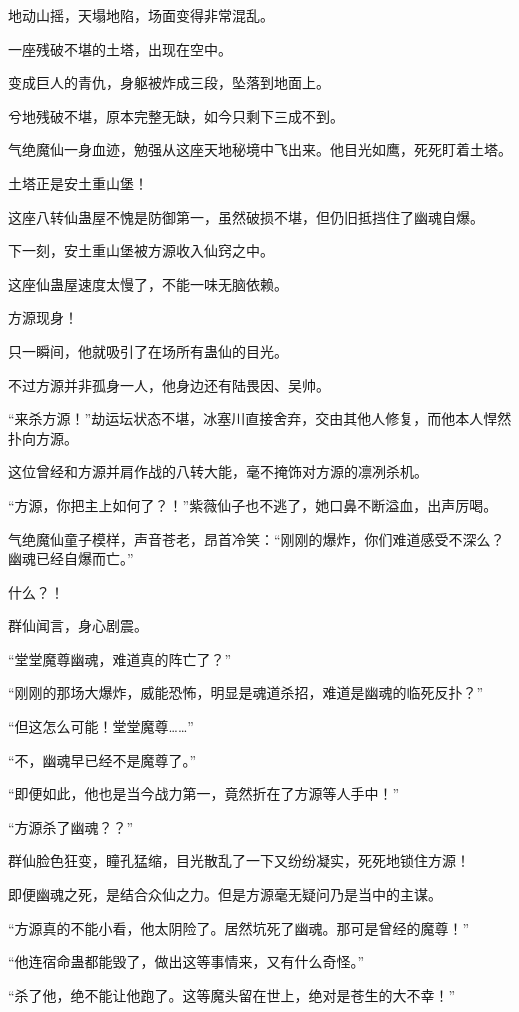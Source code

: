 \begin{this_body}
地动山摇，天塌地陷，场面变得非常混乱。

一座残破不堪的土塔，出现在空中。

变成巨人的青仇，身躯被炸成三段，坠落到地面上。

兮地残破不堪，原本完整无缺，如今只剩下三成不到。

气绝魔仙一身血迹，勉强从这座天地秘境中飞出来。他目光如鹰，死死盯着土塔。

土塔正是安土重山堡！

这座八转仙蛊屋不愧是防御第一，虽然破损不堪，但仍旧抵挡住了幽魂自爆。

下一刻，安土重山堡被方源收入仙窍之中。

这座仙蛊屋速度太慢了，不能一味无脑依赖。

方源现身！

只一瞬间，他就吸引了在场所有蛊仙的目光。

不过方源并非孤身一人，他身边还有陆畏因、吴帅。

“来杀方源！”劫运坛状态不堪，冰塞川直接舍弃，交由其他人修复，而他本人悍然扑向方源。

这位曾经和方源并肩作战的八转大能，毫不掩饰对方源的凛冽杀机。

“方源，你把主上如何了？！”紫薇仙子也不逃了，她口鼻不断溢血，出声厉喝。

气绝魔仙童子模样，声音苍老，昂首冷笑：“刚刚的爆炸，你们难道感受不深么？幽魂已经自爆而亡。”

什么？！

群仙闻言，身心剧震。

“堂堂魔尊幽魂，难道真的阵亡了？”

“刚刚的那场大爆炸，威能恐怖，明显是魂道杀招，难道是幽魂的临死反扑？”

“但这怎么可能！堂堂魔尊……”

“不，幽魂早已经不是魔尊了。”

“即便如此，他也是当今战力第一，竟然折在了方源等人手中！”

“方源杀了幽魂？？”

群仙脸色狂变，瞳孔猛缩，目光散乱了一下又纷纷凝实，死死地锁住方源！

即便幽魂之死，是结合众仙之力。但是方源毫无疑问乃是当中的主谋。

“方源真的不能小看，他太阴险了。居然坑死了幽魂。那可是曾经的魔尊！”

“他连宿命蛊都能毁了，做出这等事情来，又有什么奇怪。”

“杀了他，绝不能让他跑了。这等魔头留在世上，绝对是苍生的大不幸！”


\end{this_body}
